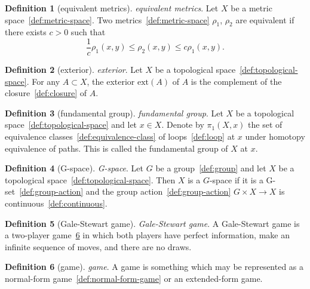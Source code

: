 \documentclass[12pt,a4paper]{article}
\theoremstyle{definition}
\newtheorem{definition}{Definition}
\begin{document}
\begin{definition}[equivalent metrics]\label{def:equivalent-metrics}
\emph{equivalent metrics}. Let $X$ be a metric space~\ref{def:metric-space}. Two metrics~\ref{def:metric-space} $\rho_1$, $\rho_2$ are equivalent if there exists $c>0$ such that $$\frac{1}{c}\rho_1(x,y) \leq \rho_2(x,y) \leq c\rho_1(x,y).$$
\end{definition}

\begin{definition}[exterior]\label{def:exterior}
\emph{exterior}. Let $X$ be a topological space~\ref{def:topological-space}. For any $A\subset X$, the exterior $\text{ext}(A)$ of $A$ is the complement of the closure~\ref{def:closure} of $A$.
\end{definition}

\begin{definition}[fundamental group]\label{def:fundamental-group}
\emph{fundamental group}. Let $X$ be a topological space~\ref{def:topological-space} and let $x \in X$. Denote by $\pi_1(X,x)$ the set of equivalence classes~\ref{def:equivalence-class} of loops~\ref{def:loop} at $x$ under homotopy equivalence of paths. This is called the fundamental group of $X$ at $x$.
\end{definition}

\begin{definition}[G-space]\label{def:g-space}
\emph{G-space}. Let $G$ be a group~\ref{def:group} and let $X$ be a topological space~\ref{def:topological-space}. Then $X$ is a $G$-space if it is a G-set~\ref{def:group-action} and the group action~\ref{def:group-action} $G\times X\to X$ is continuous~\ref{def:continuous}.
\end{definition}

\begin{definition}[Gale-Stewart game]\label{def:gale-stewart-game}
\emph{Gale-Stewart game}. A Gale-Stewart game is a two-player game~\ref{def:game} in which both players have perfect information, make an infinite sequence of moves, and there are no draws.
\end{definition}

\begin{definition}[game]\label{def:game}
\emph{game}. A game is something which may be represented as a normal-form game~\ref{def:normal-form-game} or an extended-form game.
\end{definition}
\end{document}

